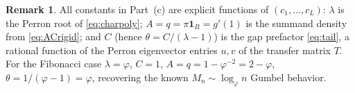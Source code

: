 \documentclass[12pt]{article}
\theoremstyle{definition}
\newtheorem{remark}{Remark}
\begin{document}
\begin{remark}
All constants in Part~(c) are explicit functions of $(c_1,\dots,c_L)$: $\lambda$
is the Perron root of \eqref{eq:charpoly}; $A=q=\pi\mathbf1_B=g'(1)$ is the
summand density from \eqref{eq:ACrigid}; and $C$ (hence
$\theta=C/(\lambda-1)$) is the gap prefactor \eqref{eq:tail}, a rational function
of the Perron eigenvector entries $u,v$ of the transfer matrix $T$. For the
Fibonacci case $\lambda=\varphi$, $C=1$, $A=q=1-\varphi^{-2}=2-\varphi$,
$\theta=1/(\varphi-1)=\varphi$, recovering the known
$M_n\sim\log_\varphi n$ Gumbel behavior.
\end{remark}
\end{document}
